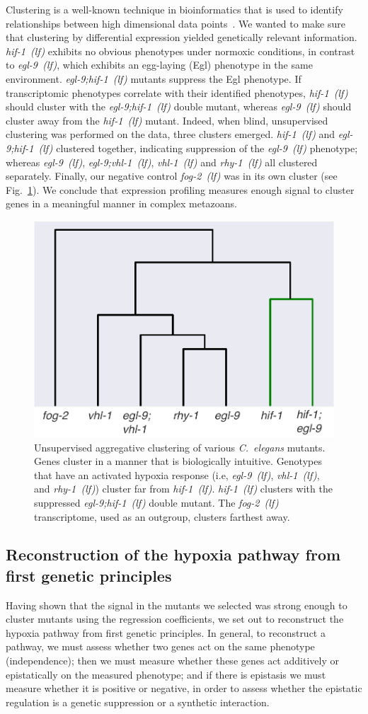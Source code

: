 \documentclass[9pt,twocolumn,twoside]{pnas-new}
\newcommand{\cel}{\emph{C.~elegans}}
\newcommand{\fog}{\emph{fog-2~(lf)}}
\newcommand{\egl}{\emph{egl-9~(lf)}}
\newcommand{\rhy}{\emph{rhy-1~(lf)}}
\newcommand{\vhl}{\emph{vhl-1~(lf)}}
\newcommand{\eglvhl}{\emph{egl-9;vhl-1~(lf)}}
\newcommand{\eglhif}{\emph{egl-9;hif-1~(lf)}}
\newcommand{\hif}{\emph{hif-1~(lf)}}
\begin{document}
Clustering is a well-known technique in bioinformatics that is used to identify
relationships between high dimensional data points~\cite{Yeung2003}. We wanted
to make sure that clustering by differential expression yielded genetically
relevant information. \hif{} exhibits no obvious phenotypes under normoxic
conditions, in contrast to \egl{}, which exhibits an egg-laying (Egl)
phenotype in the same environment. \eglhif{} mutants suppress the
Egl phenotype. If transcriptomic phenotypes correlate with their identified
phenotypes, \hif{} should cluster with the \eglhif{} double
mutant, whereas \egl{} should cluster away from the \hif{} mutant.
Indeed, when blind, unsupervised clustering was performed on the data, three
clusters emerged. \hif{} and \eglhif{} clustered together, indicating
suppression of the \egl{} phenotype; whereas \egl{}, \eglvhl{}, \vhl{} and
\rhy{} all clustered separately. Finally, our negative control \fog{} was in its
own cluster (see Fig.~\ref{fig:dendrogram}). We conclude that expression profiling
measures enough signal to cluster genes in a meaningful manner in complex
metazoans.

\begin{figure}%
\centering
\includegraphics[width=0.75\linewidth]{figs/dendrogram.pdf}
\caption{
Unsupervised aggregative clustering of various \cel{} mutants. Genes
cluster in a manner that is biologically intuitive. Genotypes that have an
activated hypoxia response (i.e, \egl{}, \vhl{}, and \rhy{}) cluster far
from \hif{}. \hif{} clusters with the suppressed \eglhif{} double mutant.
The \fog{} transcriptome, used as an outgroup, clusters farthest away.
}
\label{fig:dendrogram}
\end{figure}

\subsection*{Reconstruction of the hypoxia pathway from first genetic principles}
\label{sec:reconstruct}
Having shown that the signal in the mutants we selected was strong enough to
cluster mutants using the regression coefficients, we set out to reconstruct the
hypoxia pathway from first genetic principles. In general, to reconstruct a pathway,
we must assess whether two genes act on the same phenotype (independence);
then we must measure whether these genes act additively or epistatically on the
measured phenotype; and if there is epistasis we must measure whether it is positive
or negative, in order to assess whether the epistatic regulation is a genetic
suppression or a synthetic interaction.
\end{document}
